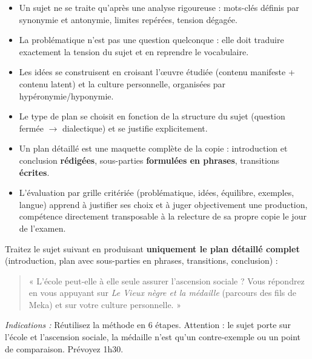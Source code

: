 \documentclass[11pt]{article}
\newcommand{\cle}[1]{{\popxbold\color{popdark}#1}}
\begin{document}
\begin{aretenir}
\begin{itemize}
\item Un sujet ne se traite qu'après une \cle{analyse rigoureuse} : mots-clés définis par synonymie et antonymie, limites repérées, tension dégagée.
\item La \cle{problématique} n'est pas une question quelconque : elle doit traduire exactement la tension du sujet et en reprendre le vocabulaire.
\item Les idées se construisent en croisant l'\cle{œuvre étudiée} (contenu manifeste + contenu latent) et la \cle{culture personnelle}, organisées par \cle{hypéronymie/hyponymie}.
\item Le \cle{type de plan} se choisit en fonction de la structure du sujet (question fermée $\rightarrow$ dialectique) et se justifie explicitement.
\item Un \cle{plan détaillé} est une maquette complète de la copie : introduction et conclusion \textbf{rédigées}, sous-parties \textbf{formulées en phrases}, transitions \textbf{écrites}.
\item L'évaluation par \cle{grille critériée} (problématique, idées, équilibre, exemples, langue) apprend à justifier ses choix et à juger objectivement une production, compétence directement transposable à la relecture de sa propre copie le jour de l'examen.
\end{itemize}
\end{aretenir}

\begin{exercice}
Traitez le sujet suivant en produisant \textbf{uniquement le plan détaillé complet} (introduction, plan avec sous-parties en phrases, transitions, conclusion) :
\begin{quote}
« L'école peut-elle à elle seule assurer l'ascension sociale ? Vous répondrez en vous appuyant sur \emph{Le Vieux nègre et la médaille} (parcours des fils de Meka) et sur votre culture personnelle. »
\end{quote}
\emph{Indications :} Réutilisez la méthode en 6 étapes. Attention : le sujet porte sur l'école et l'ascension sociale, la médaille n'est qu'un contre-exemple ou un point de comparaison. Prévoyez 1h30.
\end{exercice}
\end{document}
